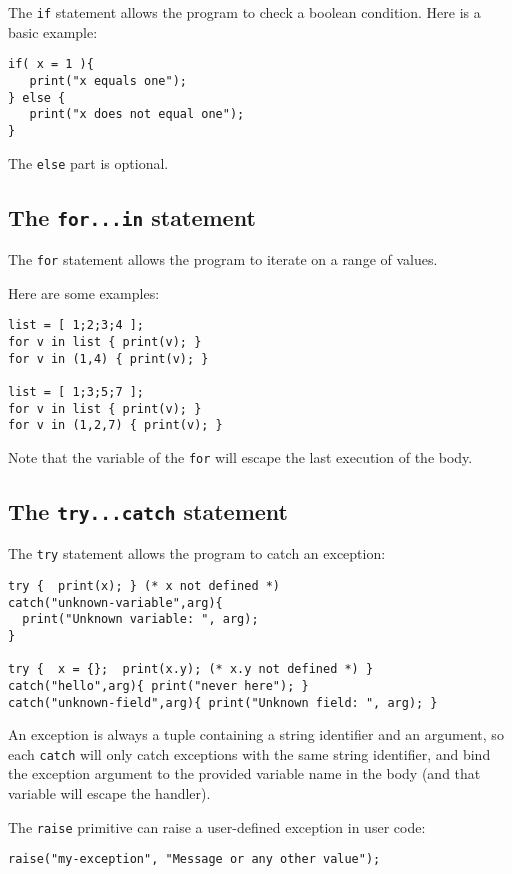 The \verb+if+ statement allows the program to check a boolean
condition.  Here is a basic example:

\begin{verbatim}
if( x = 1 ){
   print("x equals one");
} else {
   print("x does not equal one");
}
\end{verbatim}

The \verb+else+ part is optional.

\subsection{The {\tt for...in} statement}

The \verb+for+ statement allows the program to iterate on a range of values.

Here are some examples:
\begin{verbatim}
list = [ 1;2;3;4 ];
for v in list { print(v); }
for v in (1,4) { print(v); }

list = [ 1;3;5;7 ];
for v in list { print(v); }
for v in (1,2,7) { print(v); }
\end{verbatim}

Note that the variable of the \verb+for+ will escape the last
execution of the body.

\subsection{The {\tt try...catch} statement}

The \verb+try+ statement allows the program to catch an exception:

\begin{verbatim}
try {  print(x); } (* x not defined *)
catch("unknown-variable",arg){
  print("Unknown variable: ", arg);
}

try {  x = {};  print(x.y); (* x.y not defined *) }
catch("hello",arg){ print("never here"); }
catch("unknown-field",arg){ print("Unknown field: ", arg); }
\end{verbatim}

An exception is always a tuple containing a string identifier and an
argument, so each {\tt catch} will only catch exceptions with the same
string identifier, and bind the exception argument to the provided
variable name in the body (and that variable will escape the handler).

The {\tt raise} primitive can raise a user-defined exception in user code:
\begin{verbatim}
raise("my-exception", "Message or any other value");
\end{verbatim}

